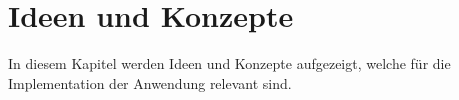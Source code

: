 \chapter{Ideen und Konzepte}
In diesem Kapitel werden Ideen und Konzepte aufgezeigt, welche für die Implementation der Anwendung relevant sind.



